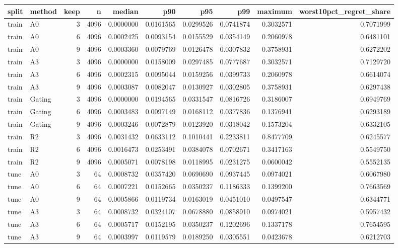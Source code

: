 \begin{tabular}{llrrrrrrrr}
\toprule
split & method & keep & n & median & p90 & p95 & p99 & maximum & worst10pct_regret_share \\
\midrule
train & A0 & 3 & 4096 & 0.0000000 & 0.0161565 & 0.0299526 & 0.0741874 & 0.3032571 & 0.7071999 \\
train & A0 & 6 & 4096 & 0.0002425 & 0.0093154 & 0.0155529 & 0.0354149 & 0.2060978 & 0.6481101 \\
train & A0 & 9 & 4096 & 0.0003360 & 0.0079769 & 0.0126478 & 0.0307832 & 0.3758931 & 0.6272202 \\
train & A3 & 3 & 4096 & 0.0000000 & 0.0158009 & 0.0297485 & 0.0777687 & 0.3032571 & 0.7129720 \\
train & A3 & 6 & 4096 & 0.0002315 & 0.0095044 & 0.0159256 & 0.0399733 & 0.2060978 & 0.6614074 \\
train & A3 & 9 & 4096 & 0.0003087 & 0.0082047 & 0.0130927 & 0.0302805 & 0.3758931 & 0.6297438 \\
train & Gating & 3 & 4096 & 0.0000000 & 0.0194565 & 0.0331547 & 0.0816726 & 0.3186007 & 0.6949769 \\
train & Gating & 6 & 4096 & 0.0003483 & 0.0097149 & 0.0168112 & 0.0377836 & 0.1376941 & 0.6293189 \\
train & Gating & 9 & 4096 & 0.0003246 & 0.0072879 & 0.0123920 & 0.0318042 & 0.1573204 & 0.6332105 \\
train & R2 & 3 & 4096 & 0.0031432 & 0.0633112 & 0.1010441 & 0.2233811 & 0.8477709 & 0.6245577 \\
train & R2 & 6 & 4096 & 0.0016473 & 0.0253491 & 0.0384078 & 0.0702671 & 0.3417163 & 0.5549750 \\
train & R2 & 9 & 4096 & 0.0005071 & 0.0078198 & 0.0118995 & 0.0231275 & 0.0600042 & 0.5552135 \\
tune & A0 & 3 & 64 & 0.0008732 & 0.0357420 & 0.0690690 & 0.0937445 & 0.0974021 & 0.6067980 \\
tune & A0 & 6 & 64 & 0.0007221 & 0.0152665 & 0.0350237 & 0.1186333 & 0.1399200 & 0.7663569 \\
tune & A0 & 9 & 64 & 0.0005866 & 0.0119734 & 0.0163019 & 0.0451010 & 0.0497547 & 0.6344771 \\
tune & A3 & 3 & 64 & 0.0008732 & 0.0324107 & 0.0678880 & 0.0858910 & 0.0974021 & 0.5957432 \\
tune & A3 & 6 & 64 & 0.0005717 & 0.0152195 & 0.0350237 & 0.1202696 & 0.1337178 & 0.7654595 \\
tune & A3 & 9 & 64 & 0.0003997 & 0.0119579 & 0.0189250 & 0.0305551 & 0.0423678 & 0.6212703 \\

\end{tabular}
